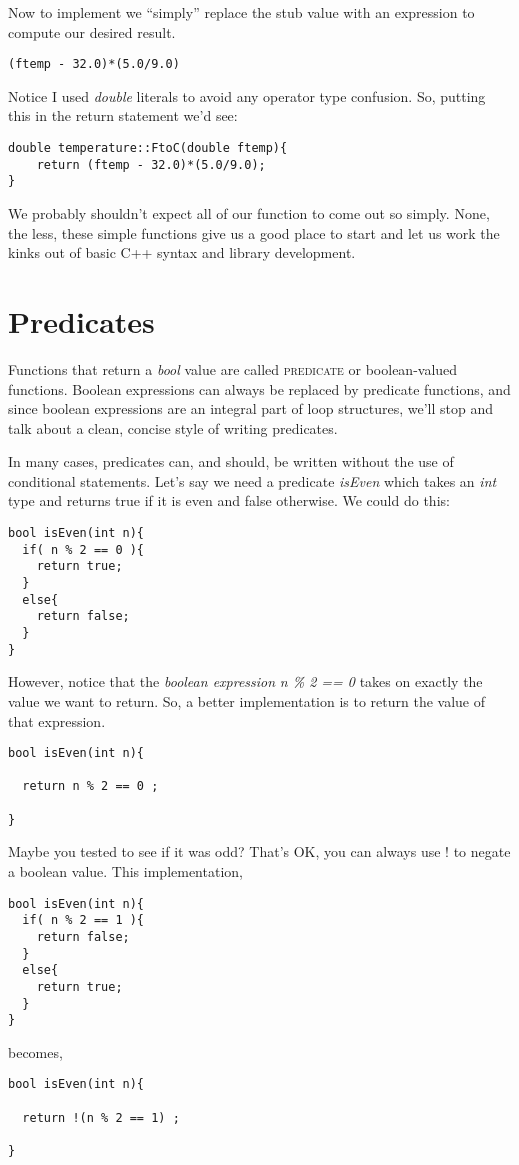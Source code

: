 \documentclass[]{tufte-handout}
\begin{document}
Now to implement we ``simply'' replace the stub value with an expression to compute our desired result.
\begin{verbatim}
(ftemp - 32.0)*(5.0/9.0)
\end{verbatim}
Notice I used \textit{double} literals to avoid any operator type confusion. So, putting this in the return statement we'd see:
\begin{verbatim}
double temperature::FtoC(double ftemp){
	return (ftemp - 32.0)*(5.0/9.0);
}
\end{verbatim}

We probably shouldn't expect all of our function to come out so simply. None, the less, these simple functions give us a good place to start and let us work the kinks out of basic C++ syntax and library development.

\section{Predicates}

Functions that return a \textit{bool} value are called \textsc{predicate} or boolean-valued functions. Boolean expressions can always be replaced by predicate functions, and since boolean expressions are an integral part of loop structures, we'll stop and talk about a clean, concise style of writing predicates.

In many cases, predicates can, and should, be written without the use of conditional statements.  Let's say we need a predicate \textit{isEven} which takes an \textit{int} type and returns true if it is even and false otherwise.  We could do this:
\begin{verbatim}
bool isEven(int n){
  if( n % 2 == 0 ){
    return true;
  }
  else{
    return false;
  }
}
\end{verbatim}

However, notice that the \textit{boolean expression} \textit{n \% 2 == 0} takes on exactly the value we want to return. So, a better implementation is to return the value of that expression.
\begin{verbatim}
bool isEven(int n){
  
  return n % 2 == 0 ;

}
\end{verbatim}

Maybe you tested to see if it was odd?  That's OK, you can always use ! to negate a boolean value. This implementation,
\begin{verbatim}
bool isEven(int n){
  if( n % 2 == 1 ){
    return false;
  }
  else{
    return true;
  }
}
\end{verbatim}
becomes,
\begin{verbatim}
bool isEven(int n){
  
  return !(n % 2 == 1) ;

}
\end{verbatim}
\end{document}
